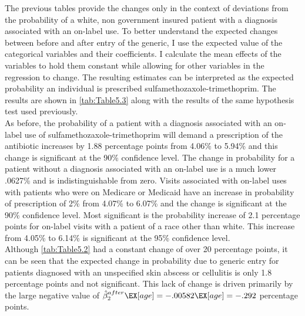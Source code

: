 
\newpage
The previous tables provide the changes only in the context of deviations from the probability of a white, non government insured patient with a diagnosis associated with an on-label use. To better understand the expected changes between before and after entry of the generic, I use the expected value of the categorical variables and their coefficients. I calculate the mean effects of the variables to hold them constant while allowing for other variables in the regression to change. The resulting estimates can be interpreted as the expected probability an individual is prescribed sulfamethozaxole-trimethoprim. The results are shown in \autoref{tab:Table5.3} along with the results of the same hypothesis test used previously.\\
\indent As before, the probability of a patient with a diagnosis associated with an on-label use of sulfamethozaxole-trimethoprim will demand a prescription of the antibiotic increases by 1.88 percentage points from 4.06\% to 5.94\% and this change is significant at the 90\% confidence level. The change in probability for a patient without a diagnosis associated with an on-label use is a much lower .0627\% and is indistinguishable from zero. Visits associated with on-label uses with patients who were on Medicare or Medicaid have an increase in probability of prescription of 2\% from 4.07\% to 6.07\% and the change is significant at the 90\% confidence level. Most significant is the probability increase of 2.1 percentage points for on-label visits with a patient of a race other than white. This increase from 4.05\% to 6.14\% is significant at the 95\% confidence level.\\
\indent Although \autoref{tab:Table5.2} had a constant change of over 20 percentage points, it can be seen that the expected change in probability due to generic entry for patients diagnosed with an unspecified skin abscess or cellulitis is only 1.8 percentage points and not significant. This lack of change is driven primarily by the large negative value of $\hat{\beta}_2^{after}\EX[age] = -.00582\EX[age] = -.292$ percentage points.
\begin{landscape}

\end{landscape}
